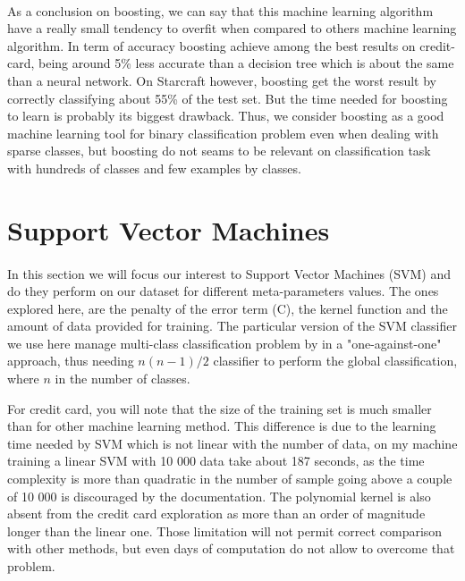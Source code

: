 \documentclass[twocolumn,a4paper,10pt]{article}
\begin{document}
\paragraph{}
As a conclusion on boosting, we can say that this machine learning algorithm have a really small tendency to overfit when compared to others machine learning algorithm. In term of accuracy boosting achieve among the best results on credit-card, being around 5\% less accurate than a decision tree which is about the same than a neural network. On Starcraft however, boosting get the worst result by correctly classifying about 55\% of the test set. But the time needed for boosting to learn is probably its biggest drawback. Thus, we consider boosting as a good machine learning tool for binary classification problem even when dealing with sparse classes, but boosting do not seams to be relevant on classification task with hundreds of classes and few examples by classes.



\section{Support Vector Machines}
\paragraph{}
In this section we will focus our interest to Support Vector Machines (SVM) and do they perform on our dataset for different meta-parameters values. The ones explored here, are the penalty of the error term (C), the kernel function and the amount of data provided for training. The particular version of the SVM classifier we use here manage multi-class classification problem by in a "one-against-one" approach, thus needing $n (n-1) / 2$ classifier to perform the global classification, where $n$ in the number of classes.

For credit card, you will note that the size of the training set is much smaller than for other machine learning method. This difference is due to the learning time needed by SVM which is not linear with the number of data, on my machine training a linear SVM with 10 000 data take about 187 seconds, as the time complexity is more than quadratic in the number of sample going above a couple of 10 000 is discouraged by the documentation. The polynomial kernel is also absent from the credit card exploration as more than an order of magnitude longer than the linear one. Those limitation will not permit correct comparison with other methods, but even days of computation do not allow to overcome that problem.
\end{document}
